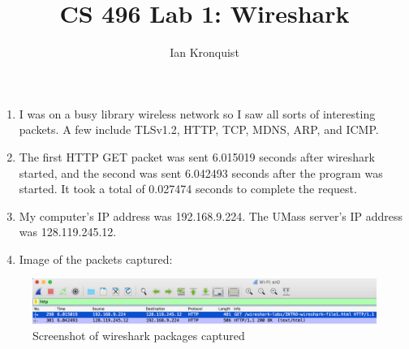 \documentclass[12pt]{article}
\title{CS 496 Lab 1: Wireshark}
\author{Ian Kronquist}
\begin{document}
\maketitle

\begin{enumerate}
    \item I was on a busy library wireless network so I saw all sorts of interesting packets. A few include TLSv1.2, HTTP, TCP, MDNS, ARP, and ICMP. \\
    \item The first HTTP GET packet was sent 6.015019 seconds after wireshark started, and the second was sent 6.042493 seconds after the program was started. It took a total of 0.027474 seconds to complete the request. \\
    \item My computer's IP address was 192.168.9.224. The UMass server's IP address was 128.119.245.12. \\
    \item Image of the packets captured:

\end{enumerate}

\begin{figure}[!ht]
    \includegraphics[scale=0.5]{./wireshark.png}
    \caption{Screenshot of wireshark packages captured}
\end{figure}
\end{document}
